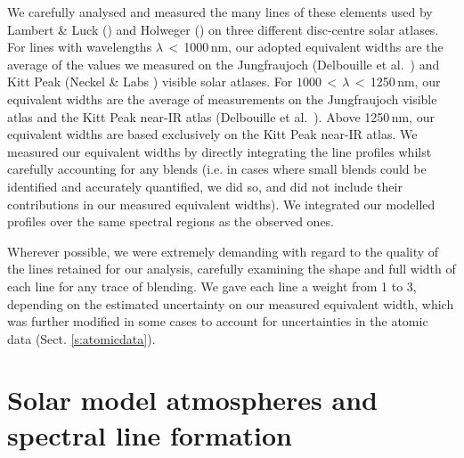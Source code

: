 \documentclass[traditabstract]{aa}
\begin{document}
We carefully analysed and measured the many lines of these elements used by Lambert \& Luck (\cite{lamb1}) and Holweger (\cite{hol1}) on three different disc-centre solar atlases.  For lines with wavelengths $\lambda$\,$<$\,1000\,nm, our adopted equivalent widths are the average of the values we measured on the Jungfraujoch (Delbouille et al.\ \cite{delb1}) and Kitt Peak (Neckel \& Labs \cite{neck}) visible solar atlases.  For $1000$\,$<$\,$\lambda$\,$<$\,1250\,nm, our equivalent widths are the average of measurements on the Jungfraujoch visible atlas and the Kitt Peak near-IR atlas (Delbouille et al.\ \cite{delb2}).  Above 1250\,nm, our equivalent widths are based exclusively on the Kitt Peak near-IR atlas. We measured our equivalent widths by directly integrating the line profiles whilst carefully accounting for any blends (i.e. in cases where small blends could be identified and accurately quantified, we did so, and did not include their contributions in our measured equivalent widths). We integrated our modelled profiles over the same spectral regions as the observed ones. 

Wherever possible, we were extremely demanding with regard to the quality of the lines retained for our analysis, carefully examining the shape and full width of each line for any trace of blending.  We gave each line a weight from 1 to 3, depending on the estimated uncertainty on our measured equivalent width, which was further modified in some cases to account for uncertainties in the atomic data (Sect. \ref{s:atomicdata}).


\section{Solar model atmospheres and spectral line formation}
\label{s:atmospheres}
\end{document}
